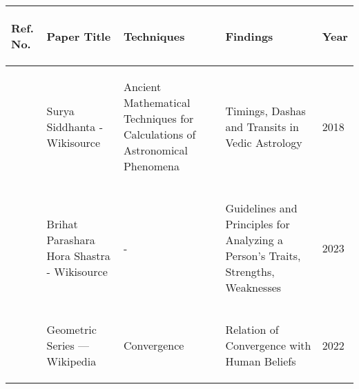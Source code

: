 \begin{tabularx}{\columnwidth}{|X|X|X|X|X|}
	\hline
	\begin{center}\textbf{Ref. No.}\end{center} & \begin{center}\textbf{Paper Title}\end{center} & \begin{center}\textbf{Techniques}\end{center} & \begin{center}\textbf{Findings}\end{center} & \begin{center}\textbf{Year}\end{center}\\
	\hline
	\begin{center}\cite{wiki:ss}\end{center} & \begin{center}Surya Siddhanta - Wikisource\end{center} & \begin{center}Ancient Mathematical Techniques for Calculations of Astronomical Phenomena\end{center} & \begin{center}Timings, Dashas and Transits in Vedic Astrology\end{center} & \begin{center}2018\end{center}\\
	\hline
	\begin{center}\cite{wiki:bphs}\end{center} & \begin{center}Brihat Parashara Hora Shastra - Wikisource\end{center} & \begin{center}-\end{center} & \begin{center}Guidelines and Principles for Analyzing a Person's Traits, Strengths, Weaknesses\end{center} & \begin{center}2023\end{center}\\
	\hline
	\begin{center}\cite{enwiki:1123380424}\end{center} & \begin{center}Geometric Series --- {Wikipedia}\end{center} & \begin{center}Convergence\end{center} & \begin{center}Relation of Convergence with Human Beliefs\end{center} & \begin{center}2022\end{center}\\

\end{tabularx}
